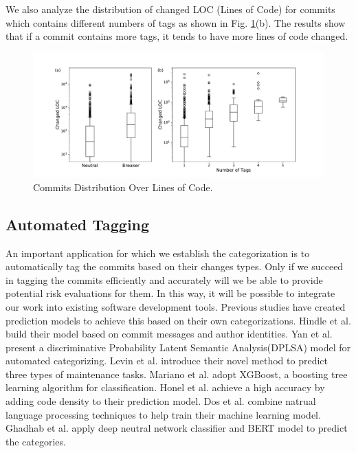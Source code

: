 We also analyze the distribution of changed LOC (Lines of Code) for commits which contains different numbers of tags as shown in Fig. \ref{fig: commit_LOC}(b).
The results show that if a commit contains more tags, it tends to have more lines of code changed. 
\begin{figure}[htbp]
\centerline{\includegraphics[scale=0.5]{figures/commit_size.pdf}}
\caption{Commits Distribution Over Lines of Code.}
\label{fig: commit_LOC}
\end{figure}

\subsection{Automated Tagging}
An important application for which we establish the categorization is to automatically tag the commits based on their changes types.
Only if we succeed in tagging the commits efficiently and accurately will we be able to provide potential risk evaluations for them. 
In this way, it will be possible to integrate our work into existing software development tools.
Previous studies have created prediction models to achieve this based on their own categorizations.
Hindle et al. \cite{Hindle_auto} build their model based on commit messages and author identities.
Yan et al. \cite{yan2016automatically} present a discriminative Probability Latent Semantic Analysis(DPLSA) model for automated categorizing. 
Levin et al. \cite{levin2017boosting} introduce their novel method to predict three types of maintenance tasks. 
Mariano et al. \cite{mariano2019feature} adopt XGBoost, a boosting tree learning algorithm for classification.
Honel et al. \cite{honel2019importance} achieve a high accuracy by adding code density to their prediction model.
Dos et al. \cite{dos2020commit} combine natrual language processing techniques to help train their machine learning model.
Ghadhab et al. \cite{ghadhab2021augmenting} apply deep neutral network classifier and BERT model to predict the categories.

